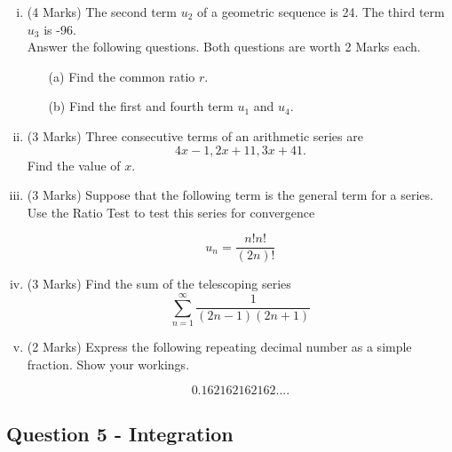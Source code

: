 ﻿ \documentclass[a4paper,12pt]{article}
\begin{document}
\begin{enumerate}[(i)]
	\item (4 Marks)
	The second term $u_2$ of a geometric sequence is 24. The third term $u_3$ is -96. \\ \bigskip Answer the following questions. Both questions are worth 2 Marks each.
	\begin{itemize}
		\item[(a)] Find the common ratio $r$. 
		\item[(b)] Find the first and fourth term $u_1$ and $u_4$.
	\end{itemize}

	
\bigskip

	\item (3 Marks)	Three consecutive terms of an arithmetic series are \[4x - 1, 2x +11, 3x + 41. \]
	Find the value of $x$.
	

\bigskip
	
	\item (3 Marks) Suppose that the following term is the general term for a series. Use the Ratio Test to test this series for convergence
	
	\[u_n=\frac{n!n!}{(2n)!}\]

\bigskip
	
		\item (3 Marks) Find the sum of the telescoping series  \[ \sum^{\infty}_{n=1} \frac{1}{(2n-1)(2n+1)}\]

\bigskip
		
	\item (2 Marks) Express the following repeating decimal number as a simple fraction. Show your workings.
	
	\[0.162162162162....\]
%	
%	
	
	
	
\end{enumerate}

\newpage
\subsection*{Question 5 - Integration}


\end{document}
